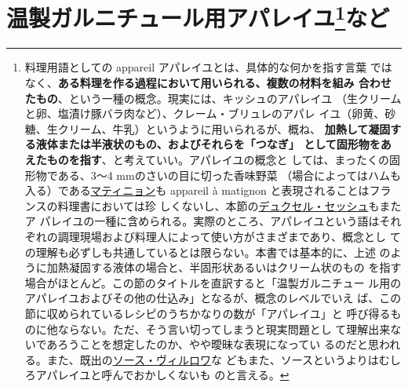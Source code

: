 \hypertarget{serie-des-appareiles-et-preparations-diverses-pour-garnitures-chaudes}{%
\section[温製ガルニチュール用アパレイユなど]{\texorpdfstring{温製ガルニチュール用アパレイユ\footnote{料理用語としての
  appareil アパレイユとは、具体的な何かを指す言葉
  ではなく、\textbf{ある料理を作る過程において用いられる、複数の材料を組み
  合わせたもの}、という一種の概念。現実には、キッシュのアパレイユ
  （生クリームと卵、塩漬け豚バラ肉など）、クレーム・ブリュレのアパレ
  イユ（卵黄、砂糖、生クリーム、牛乳）というように用いられるが、概ね、
  \textbf{加熱して凝固する液体または半液状のもの、およびそれらを「つなぎ」
  として固形物をあえたものを指す}、と考えていい。アパレイユの概念と
  しては、まったくの固形物である、3〜4 mmのさいの目に切った香味野菜
  （場合によってはハムも入る）である\protect\hyperlink{matignon}{マティニョン}も
  appareil à matignon と表現されることはフランスの料理書においては珍
  しくないし、本節の\protect\hyperlink{duxelles-seche}{デュクセル・セッシュ}もまたア
  パレイユの一種に含められる。実際のところ、アパレイユという語はそれ
  ぞれの調理現場および料理人によって使い方がさまざまであり、概念とし
  ての理解も必ずしも共通しているとは限らない。本書では基本的に、上述
  のように加熱凝固する液体の場合と、半固形状あるいはクリーム状のもの
  を指す場合がほとんど。この節のタイトルを直訳すると「温製ガルニチュー
  ル用のアパレイユおよびその他の仕込み」となるが、概念のレベルでいえ
  ば、この節に収められているレシピのうちかなりの数が「アパレイユ」と
  呼び得るものに他ならない。ただ、そう言い切ってしまうと現実問題とし
  て理解出来ないであろうことを想定したのか、やや曖昧な表現になってい
  るのだと思われる。また、既出の\protect\hyperlink{sauce-villeroy}{ソース・ヴィルロワ}な
  どもまた、ソースというよりはむしろアパレイユと呼んでおかしくないも
  のと言える。}など}{温製ガルニチュール用アパレイユなど}}\label{serie-des-appareiles-et-preparations-diverses-pour-garnitures-chaudes}}


